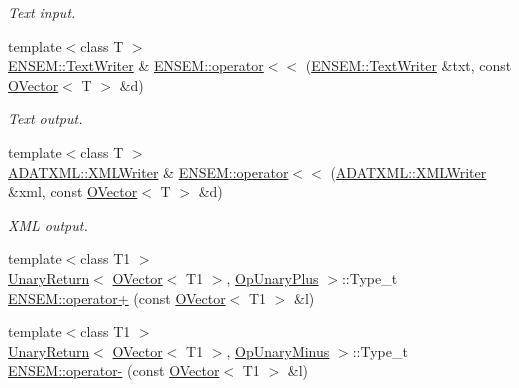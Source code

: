\begin{DoxyCompactItemize}
\begin{DoxyCompactList}\small\item\em Text input. \end{DoxyCompactList}\item 
{\footnotesize template$<$class T $>$ }\\\mbox{\hyperlink{classENSEM_1_1TextWriter}{E\+N\+S\+E\+M\+::\+Text\+Writer}} \& \mbox{\hyperlink{group__obsvector_gab5665d6ff814904bdb812d03f102731a}{E\+N\+S\+E\+M\+::operator$<$$<$}} (\mbox{\hyperlink{classENSEM_1_1TextWriter}{E\+N\+S\+E\+M\+::\+Text\+Writer}} \&txt, const \mbox{\hyperlink{classENSEM_1_1OVector}{O\+Vector}}$<$ T $>$ \&d)
\begin{DoxyCompactList}\small\item\em Text output. \end{DoxyCompactList}\item 
{\footnotesize template$<$class T $>$ }\\\mbox{\hyperlink{classADATXML_1_1XMLWriter}{A\+D\+A\+T\+X\+M\+L\+::\+X\+M\+L\+Writer}} \& \mbox{\hyperlink{group__obsvector_ga21a786931a7efb82964106799b422557}{E\+N\+S\+E\+M\+::operator$<$$<$}} (\mbox{\hyperlink{classADATXML_1_1XMLWriter}{A\+D\+A\+T\+X\+M\+L\+::\+X\+M\+L\+Writer}} \&xml, const \mbox{\hyperlink{classENSEM_1_1OVector}{O\+Vector}}$<$ T $>$ \&d)
\begin{DoxyCompactList}\small\item\em X\+ML output. \end{DoxyCompactList}\item 
{\footnotesize template$<$class T1 $>$ }\\\mbox{\hyperlink{structENSEM_1_1UnaryReturn}{Unary\+Return}}$<$ \mbox{\hyperlink{classENSEM_1_1OVector}{O\+Vector}}$<$ T1 $>$, \mbox{\hyperlink{structENSEM_1_1OpUnaryPlus}{Op\+Unary\+Plus}} $>$\+::Type\+\_\+t \mbox{\hyperlink{group__obsvector_gac2f83a4dfd7def38a8b25cf6a1e32c7c}{E\+N\+S\+E\+M\+::operator+}} (const \mbox{\hyperlink{classENSEM_1_1OVector}{O\+Vector}}$<$ T1 $>$ \&l)
\item 
{\footnotesize template$<$class T1 $>$ }\\\mbox{\hyperlink{structENSEM_1_1UnaryReturn}{Unary\+Return}}$<$ \mbox{\hyperlink{classENSEM_1_1OVector}{O\+Vector}}$<$ T1 $>$, \mbox{\hyperlink{structENSEM_1_1OpUnaryMinus}{Op\+Unary\+Minus}} $>$\+::Type\+\_\+t \mbox{\hyperlink{group__obsvector_ga914cf43b5cebf3dc6244c6f4f82435be}{E\+N\+S\+E\+M\+::operator-\/}} (const \mbox{\hyperlink{classENSEM_1_1OVector}{O\+Vector}}$<$ T1 $>$ \&l)
\item 

\end{DoxyCompactItemize}
